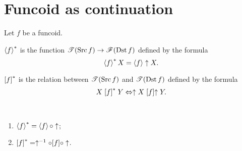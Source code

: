 \section{Funcoid as continuation}

Let $f$ be a funcoid.
\begin{defn}
$\left\langle f\right\rangle ^{\ast}$ is the function $\mathscr{T}(\operatorname{Src} f)\rightarrow\mathscr{F}(\operatorname{Dst} f)$
defined by the formula
\[
\left\langle f\right\rangle ^{\ast}X=\left\langle f\right\rangle\uparrow X.
\]

\end{defn}

\begin{defn}
$\mathrel{\left[f\right]^{\ast}}$ is the relation between $\mathscr{T}(\operatorname{Src} f)$ and $\mathscr{T}(\operatorname{Dst}
f)$
defined by the formula
\[
X\mathrel{\left[f\right]^{\ast}}Y\Leftrightarrow\uparrow X\mathrel{\left[f\right]}\uparrow Y.
\]
\end{defn}
\begin{obvious}
~
\begin{enumerate}
\item $\left\langle f\right\rangle ^{\ast}=\left\langle f\right\rangle\circ\uparrow$;
\item $\mathord{\mathrel{\left[f\right]^{\ast}}}=\uparrow^{-1}\circ\mathord{\mathrel{\left[f\right]}}\circ\uparrow$.
\end{enumerate}
\end{obvious}

